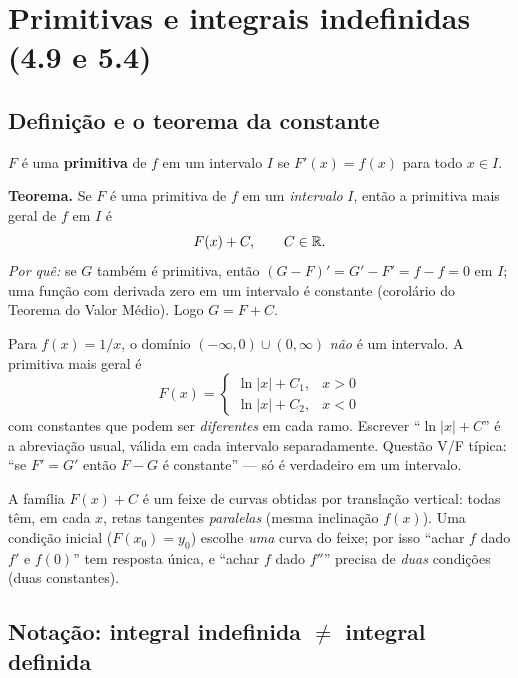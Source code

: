 \section{Primitivas e integrais indefinidas (4.9 e 5.4)}

\subsection{Definição e o teorema da constante}

\begin{definicao}[{Primitiva}]
$F$ é uma \textbf{primitiva} de $f$ em um intervalo $I$ se $F'(x)=f(x)$ para todo $x\in I$.

\textbf{Teorema.} Se $F$ é uma primitiva de $f$ em um \emph{intervalo} $I$, então a primitiva mais geral de $f$ em $I$ é
\[
F(x)+C,\qquad C\in\mathbb{R} .
\]
\emph{Por quê:} se $G$ também é primitiva, então $(G-F)'=G'-F'=f-f=0$ em $I$; uma função com derivada zero em um intervalo é constante (corolário do Teorema do Valor Médio). Logo $G=F+C$.
\end{definicao}

\begin{armadilha}
Para $f(x)=1/x$, o domínio $(-\infty,0)\cup(0,\infty)$ \emph{não} é um intervalo. A primitiva mais geral é
\[
F(x)=\begin{cases}\ln|x|+C_1, & x>0\\ \ln|x|+C_2, & x<0\end{cases}
\]
com constantes que podem ser \emph{diferentes} em cada ramo. Escrever ``$\ln|x|+C$'' é a abreviação usual, válida em cada intervalo separadamente. Questão V/F típica: ``se $F'=G'$ então $F-G$ é constante'' --- só é verdadeiro em um intervalo.
\end{armadilha}

\begin{geo}
A família $F(x)+C$ é um feixe de curvas obtidas por translação vertical: todas têm, em cada $x$, retas tangentes \emph{paralelas} (mesma inclinação $f(x)$). Uma condição inicial ($F(x_0)=y_0$) escolhe \emph{uma} curva do feixe; por isso ``achar $f$ dado $f'$ e $f(0)$'' tem resposta única, e ``achar $f$ dado $f''$'' precisa de \emph{duas} condições (duas constantes).
\end{geo}

\subsection{Notação: integral indefinida $\neq$ integral definida}

